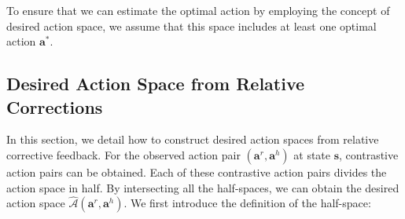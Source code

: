 To ensure that we can estimate the optimal action by employing the concept of desired action space, we assume that this space includes at least one optimal action $\bm a^*$.









\subsection{Desired Action Space from Relative Corrections}
\label{sec:sub:desired_action_space_relative}

In this section, we detail how to construct desired action spaces from relative corrective feedback.
For the observed action pair $(\bm a^r, \bm a^h)$ at state $\bm s$, contrastive action pairs can be obtained. 
Each of these contrastive action pairs divides the action space in half.
By intersecting all the half-spaces, we can obtain the desired action space $\hat{\mathcal{A}}(\bm a^r, \bm a^h)$.
We first introduce the definition of the half-space: 

